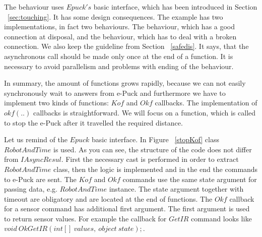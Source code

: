   The behaviour  uses $Epuck's$ basic interface,	
  which has been introduced in Section ~\ref{sec:touching}.
  It has some design consequences. The example has two implementations, in fact two behaviours. 
  The behaviour, which has a good connection at disposal,
  and the behaviour, which has to deal with a broken connection.
  We also keep the guideline from Section ~\ref{safedis}. 
  It says, that the asynchronous call should be made only once at the end of a function.
  It is necessary to avoid parallelism and problems with ending of the behaviour.

  In summary, the amount of functions grows rapidly, 
  because we can not easily synchronously wait to answers from e-Puck
  and furthermore we have to implement two kinds of functions: $Kof$ and $Okf$ callbacks.
  The implementation of $okf(..)$ callbacks is straightforward. 
  We will focus on a function, which is called to stop the e-Puck after it travelled the required distance.

  Let us remind of the $Epuck$ basic interface.
  In Figure ~\ref{stopKof} class $RobotAndTime$ is used. 
  As you can see, the structure of the code does not differ from $IAsyncResul$. 
  First the necessary cast is performed in order to 
  extract $RobotAndTime$ class, then the logic is implemented and in the end 
  the commands to e-Puck are sent.
  The $Kof$ and $Okf$ commands use the same state argument for passing data,
  e.g. $RobotAndTime$ instance. The state argument together 
  with timeout are obligatory and are located at the end of functions.
  The $Okf$ callback for a sensor command has additional first argument. 
  The first argument is used to return sensor values. For example
  the callback for $GetIR$ command looks like $void\ OkGetIR(int[]\ values,\ object\ state);$.
  
